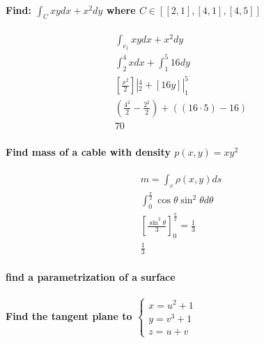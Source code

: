 \documentclass[11pt,fleqn]{book} %
\begin{document}
\paragraph*{Find: $\int_C xy dx + x^2 dy$ where $ C \in [[2,1],[4,1],[4,5]]$}

\begin{gather}
    \int_{c_1} xy dx + x^2 dy \\
    \int_2^4 x dx + \int_1^5 16 dy \\
    [\frac{x^2}{2}]|_2^4 + [16y]|_1^5\\
    (\frac{4^2}{2} - \frac{2^2}{2}) + ((16 \cdot 5) - 16)\\
    70
\end{gather}

\paragraph*{Find mass of a cable with density $p(x,y) = xy^2$}

\begin{gather}
    m = \int_c \rho(x,y) ds\\
    \int_0^{\frac{\pi}{2}} \cos \theta \sin^2 \theta d\theta\\
    [\frac{\sin^3 \theta}{3}]_0^{\frac{\pi}{2}} = \frac{1}{3}\\
    \frac{1}{3}
\end{gather}

\paragraph*{find a parametrization of a surface}

\paragraph*{Find the tangent plane to $\begin{cases}
x = u^2 + 1 \\
y = v^3 + 1 \\
z = u+v
\end{cases}$}
\end{document}
